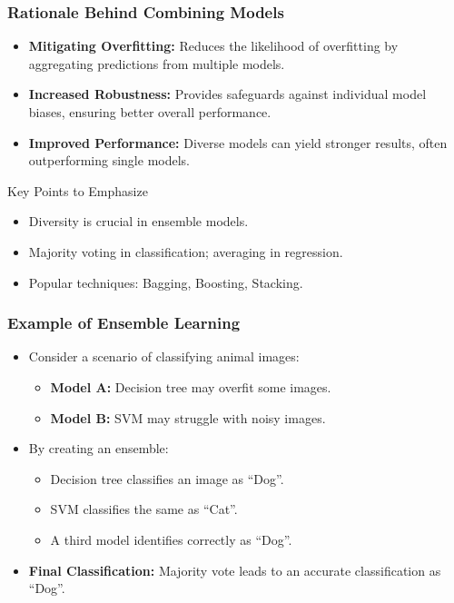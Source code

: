 \documentclass[aspectratio=169]{beamer}
\begin{document}
\begin{frame}[fragile]
    \frametitle{Rationale Behind Combining Models}
    \begin{itemize}
        \item \textbf{Mitigating Overfitting:} Reduces the likelihood of overfitting by aggregating predictions from multiple models.
        \item \textbf{Increased Robustness:} Provides safeguards against individual model biases, ensuring better overall performance.
        \item \textbf{Improved Performance:} Diverse models can yield stronger results, often outperforming single models.
    \end{itemize}
    \begin{block}{Key Points to Emphasize}
        \begin{itemize}
            \item Diversity is crucial in ensemble models.
            \item Majority voting in classification; averaging in regression.
            \item Popular techniques: Bagging, Boosting, Stacking.
        \end{itemize}
    \end{block}
\end{frame}

\begin{frame}[fragile]
    \frametitle{Example of Ensemble Learning}
    \begin{itemize}
        \item Consider a scenario of classifying animal images:
        \begin{itemize}
            \item \textbf{Model A:} Decision tree may overfit some images.
            \item \textbf{Model B:} SVM may struggle with noisy images.
        \end{itemize}
        \item By creating an ensemble:
        \begin{itemize}
            \item Decision tree classifies an image as “Dog”.
            \item SVM classifies the same as “Cat”.
            \item A third model identifies correctly as “Dog”.
        \end{itemize}
        \item \textbf{Final Classification:} Majority vote leads to an accurate classification as “Dog”.
    \end{itemize}
\end{frame}
\end{document}

